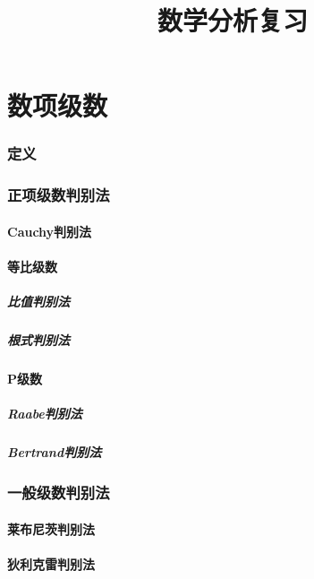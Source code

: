 \documentclass[UTF8]{ctexart}
\title{数学分析复习}
\begin{document}
    \pagestyle{plain}
    \maketitle
    \tableofcontents
\part{数项级数}
\section{定义}
\section{正项级数判别法}
    \subsection{Cauchy判别法}
    \subsection{等比级数}
        \subsubsection{比值判别法}
        \subsubsection{根式判别法}
    \subsection{P级数}
        \subsubsection{Raabe判别法}
        \subsubsection{Bertrand判别法}
\section{一般级数判别法}
    \subsection{莱布尼茨判别法}
    \subsection{狄利克雷判别法}
\end{document}
